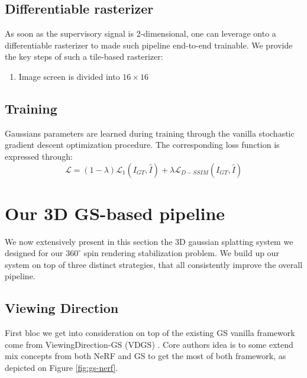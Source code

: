 \subsection{Differentiable rasterizer} As soon as the supervisory signal is 2-dimensional, one can leverage onto a differentiable rasterizer to made such pipeline end-to-end trainable. We provide the key steps of such a tile-based rasterizer: 

\begin{enumerate}
    \item Image screen is divided into $16\times 16$ 
\end{enumerate}

\subsection{Training} 
Gaussians parameters are learned during training through the vanilla stochastic gradient descent optimization procedure. The corresponding loss function is expressed through: 
\begin{equation}
    \mathcal{L} = (1-\lambda)\mathcal{L}_{1}(I_{GT},\hat{I}) + \lambda \mathcal{L}_{D-SSIM}(I_{GT},\hat{I})
\end{equation}

\section{Our 3D GS-based pipeline}
We now extensively present in this section the 3D gaussian splatting system we designed for our $360^{\circ}$ spin rendering stabilization problem. We build up our system on top of three distinct strategies, that all consistently improve the overall pipeline. 

\subsection{Viewing Direction}
First bloc we get into consideration on top of the existing GS vanilla framework come from ViewingDirection-GS (VDGS) \citep{malarz2023gaussian}. Core authors idea is to some extend mix concepts from both NeRF and GS to get the most of both framework, as depicted on Figure \ref{fig:gs-nerf}. 

